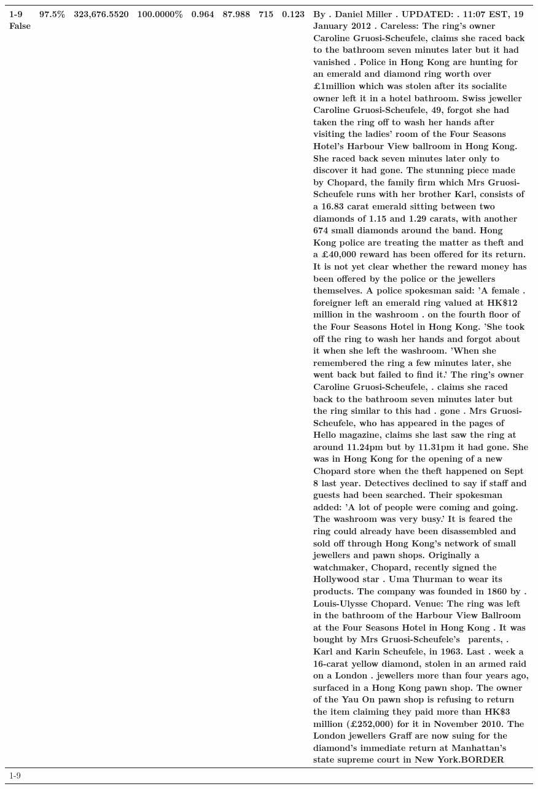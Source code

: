 \begin{table}[H]
\begin{tabular}{lllrlllll}
\cline{1-9} \cline{2-9}
False & 97.5\% & 323,676.5520 & \bfseries \color{red} 100.0000\% & 0.964 & 87.988 & 715 & 0.123 & By . Daniel Miller . UPDATED: . 11:07 EST, 19 January 2012 . Careless: The ring's owner Caroline Gruosi-Scheufele, claims she raced back to the bathroom seven minutes later but it had vanished . Police in Hong Kong are hunting for an emerald and diamond ring worth over £1million which was stolen after its socialite owner left it in a hotel bathroom. Swiss jeweller Caroline Gruosi-Scheufele, 49, forgot she had taken the ring off to wash her hands after visiting the ladies' room of the Four Seasons Hotel's Harbour View ballroom in Hong Kong. She raced back seven minutes later only to discover it had gone. The stunning piece made by Chopard, the family firm which Mrs Gruosi-Scheufele runs with her brother Karl, consists of a 16.83 carat emerald sitting between two diamonds of 1.15 and 1.29 carats, with another 674 small diamonds around the band. Hong Kong police are treating the matter as theft and a £40,000 reward has been offered for its return. It is not yet clear whether the reward money has been offered by the police or the jewellers themselves. A police spokesman said: 'A female . foreigner left an emerald ring valued at HK\$12 million in the washroom . on the fourth floor of the Four Seasons Hotel in Hong Kong. 'She took off the ring to wash her hands and forgot about it when she left the washroom. 'When she remembered the ring a few minutes later, she went back but failed to find it.' The ring's owner Caroline Gruosi-Scheufele, . claims she raced back to the bathroom seven minutes later but the ring similar to this had . gone . Mrs Gruosi-Scheufele, who has appeared in the pages of Hello magazine, claims she last saw the ring at around 11.24pm but by 11.31pm it had gone. She was in Hong Kong for the opening of a new Chopard store when the theft happened on Sept 8 last year. Detectives declined to say if staff and guests had been searched. Their spokesman added: 'A lot of people were coming and going. The washroom was very busy.' It is feared the ring could already have been disassembled and sold off through Hong Kong's network of small jewellers and pawn shops. Originally a watchmaker, Chopard, recently signed the Hollywood star . Uma Thurman to wear its products. The company was founded in 1860 by . Louis-Ulysse Chopard. Venue: The ring was left in the bathroom of the Harbour View Ballroom at the Four Seasons Hotel in Hong Kong . It was bought by Mrs Gruosi-Scheufele's  parents, . Karl and Karin Scheufele, in 1963. Last . week a 16-carat yellow diamond, stolen in an armed raid on a London . jewellers more than four years ago, surfaced in a Hong Kong pawn shop. The owner of the Yau On pawn shop is refusing to return the item claiming they paid more than HK\$3 million (£252,000) for it in November 2010. The London jewellers Graff are now suing for the diamond’s immediate return at Manhattan’s state supreme court in New York.BORDER \\
\cline{1-9} \cline{2-9}
\bottomrule
\end{tabular}
\end{table}
